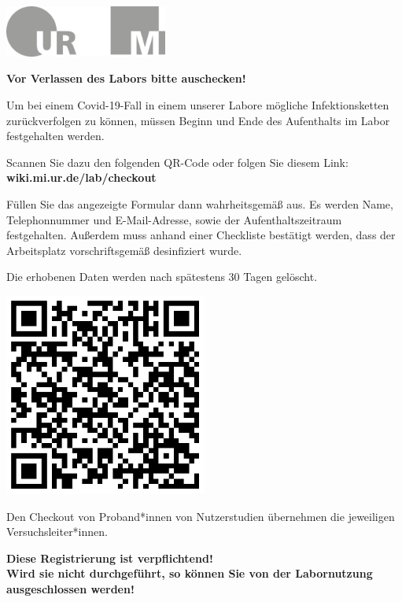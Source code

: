 \documentclass[24pt, a4paper, portrait]{article}
\begin{document}
\pagestyle{empty}

\raggedleft

\includegraphics[width=0.4\textwidth]{logo}

\vspace{1cm}
\sffamily
\centering
\huge

\textbf{Vor Verlassen des Labors bitte auschecken!}

\vspace{1cm}

\raggedright
\Large

Um bei einem Covid-19-Fall in einem unserer Labore mögliche Infektionsketten zurückverfolgen zu können, müssen Beginn und Ende des Aufenthalts im Labor festgehalten werden.

\medskip

Scannen Sie dazu den folgenden QR-Code oder folgen Sie diesem Link: \textbf{wiki.mi.ur.de/lab/checkout}

\medskip

Füllen Sie das angezeigte Formular dann wahrheitsgemäß aus.
Es werden Name, Telephonnummer und E-Mail-Adresse, sowie der Aufenthaltszeitraum festgehalten.
Außerdem muss anhand einer Checkliste bestätigt werden, dass der Arbeitsplatz vorschriftsgemäß desinfiziert wurde.

Die erhobenen Daten werden nach spätestens 30 Tagen gelöscht.

\vspace{1cm}
\centering
\includegraphics[width=0.5\textwidth]{qr/vr4_studio_checkout}

\vspace{1cm}
\raggedright
Den Checkout von Proband*innen von Nutzerstudien übernehmen die jeweiligen Versuchsleiter*innen.

\vspace{5mm}
\centering
\huge
\textbf{Diese Registrierung ist verpflichtend! \\ Wird sie nicht durchgeführt, so können Sie von der Labornutzung ausgeschlossen werden!}
\end{document}

